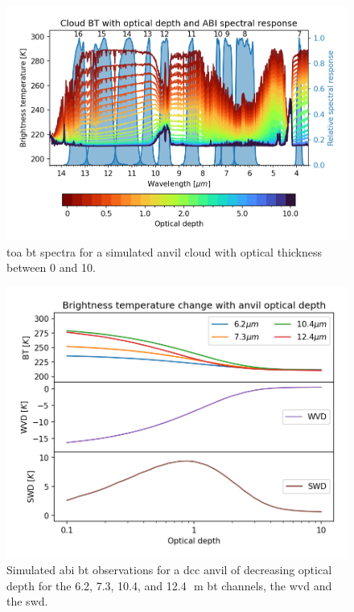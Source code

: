 \begin{figure}[t]
    \includegraphics[width=\textwidth]{figures/chapter1_08.png}
    \caption[
    \acrshort{toa} \acrshort{bt} spectra for a simulated anvil cloud with optical thickness between 0 and 10
    ]{
    \acrshort{toa} \acrshort{bt} spectra for a simulated anvil cloud with optical thickness between 0 and 10. 
    }
    \label{fig:optical_depth_spectra}
\end{figure}

\begin{figure}[t]
    \includegraphics[width=\textwidth]{figures/chapter1_09.png}
    \caption[
    Simulated \acrshort{abi} \acrshort{bt} observations for a \acrshort{dcc} anvil of decreasing optical depth
    ]{
    Simulated \acrshort{abi} \acrshort{bt} observations for a \acrshort{dcc} anvil of decreasing optical depth for the 6.2, 7.3, 10.4, and 12.4\,\unit{\mu m} \acrshort{bt} channels, the \acrshort{wvd} and the \acrshort{swd}.
    }
    \label{fig:optical_depth_channels}
\end{figure}


